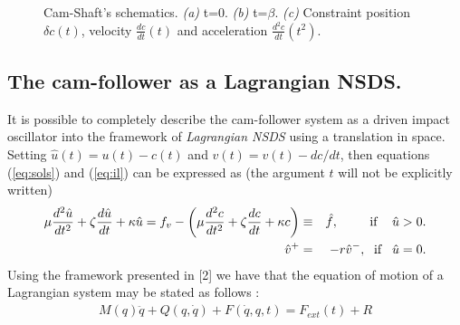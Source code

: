 \begin{figure}[hbtp]
  \caption{Cam-Shaft's schematics. \textit{(a)} t=0. \textit{(b)} t=$\beta$. \textit{(c)} Constraint position $\delta c(t)$, velocity $\frac{dc}{dt}(t)$ and acceleration $\frac{d^{2}c}{dt}(t^{2})$.}
  \label{Fig:cam-shaft}
\end{figure}
\subsection{The cam-follower as a Lagrangian NSDS.}
 It is possible to completely describe the cam-follower system as a
 driven impact oscillator into the framework of \textit{Lagrangian NSDS} using a
translation in space. Setting $\hat u(t)=u(t)-c(t)$ and $\hat
v(t)= v(t)-dc/dt$, then equations (\ref{eq:sols}) and
(\ref{eq:il}) can be expressed as (the argument $t$ will not be
explicitly written)
\begin{eqnarray}
  \label{eq:trans}
  \mu\frac{d^2\hat u}{dt^2}+\zeta\frac{d\hat u}{dt}+\kappa
  \hat u=f_{v}-\left(\mu\frac{d^2c}{dt^2}+\zeta\frac{dc}{dt}+\kappa
  c\right)&\equiv &\hat f,  \; \text{\hspace{6.5mm} \text{if} \hspace{3mm}$\hat u >
 0$.}\\
\hat v^+&=&-r \hat v^- , \; \text{ \text{if}\hspace{3mm}$\hat
u=0$.}
\end{eqnarray}
Using the framework presented in [2] we have that the equation of
motion of a Lagrangian system may be stated as follows :
\begin{eqnarray}
  \label{eq:lag1}
  M(q)\ddot q + Q(q,\dot q) + F(\dot q, q , t) = F_{ext}(t) + R
\end{eqnarray}

